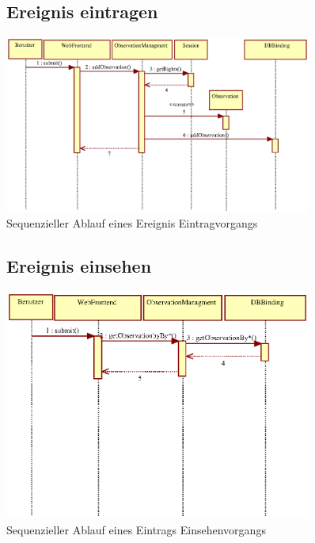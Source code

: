 \documentclass[a4paper,11pt]{scrartcl}
\begin{document}
\begin{figure}[htbp]
\subsection{Ereignis eintragen}
		\centering
		\includegraphics[width=0.90\textwidth]{images/seq09_EreignisEintragen.eps}
		\caption{Sequenzieller Ablauf eines Ereignis Eintragvorgangs}
		\label{seq02}
\end{figure}


\begin{figure}[htbp]
\subsection{Ereignis einsehen}
		\centering
		\includegraphics[width=0.90\textwidth]{images/seq10_EreignisEinsehen.eps}
		\caption{Sequenzieller Ablauf eines Eintrags Einsehenvorgangs}
		\label{seq10}
\end{figure}
\end{document}
